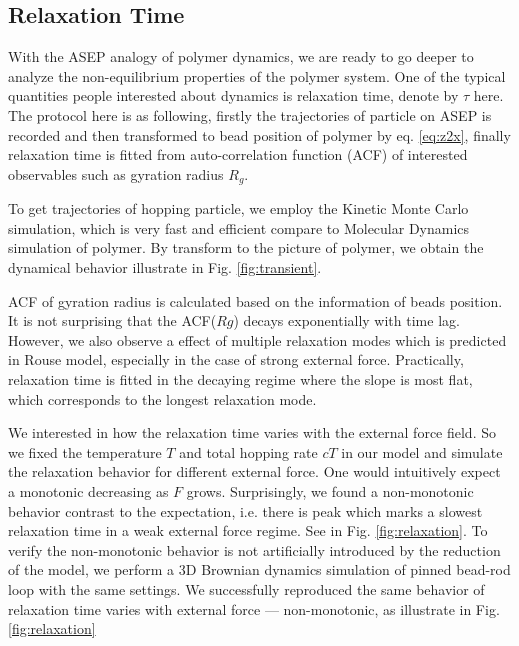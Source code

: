 \documentclass[aps,showpacs,twocolumn,floatfix,prx,superscriptaddress]{revtex4-1}
\begin{document}
\subsection{Relaxation Time}
With the ASEP analogy of polymer dynamics, we are ready to go deeper to analyze
the non-equilibrium properties of the polymer system. One of the typical
quantities people interested about dynamics is relaxation time, denote by
$\tau$ here. The protocol here is as following, firstly the trajectories of
particle on ASEP is recorded and then transformed to bead position of polymer
by eq.  \eqref{eq:z2x}, finally relaxation time is fitted from auto-correlation
function (ACF) of interested observables such as gyration radius $R_g$.

To get trajectories of hopping particle, we employ the Kinetic Monte Carlo
simulation\cite{}, which is very fast and efficient compare to Molecular Dynamics
simulation of polymer. By transform to the picture of polymer, we obtain the
dynamical behavior illustrate in Fig. \ref{fig:transient}. 

ACF of gyration radius is calculated based on the information of beads position.
It is not surprising that the ACF($Rg$) decays exponentially with time
lag. However, we also observe a effect of multiple relaxation modes which is
predicted in Rouse model, especially in the case of strong external force.
Practically, relaxation time is fitted in the decaying regime where the slope
is most flat, which corresponds to the longest relaxation mode.   

We interested in how the relaxation time varies with the external force field.
So we fixed the temperature $T$ and total hopping rate $cT$ in our model and
simulate the relaxation behavior for different external force. One would
intuitively expect a monotonic decreasing as $F$ grows. Surprisingly, we found a
non-monotonic behavior contrast to the expectation, i.e. there is peak which
marks a slowest relaxation time in a weak external force regime. See in Fig.
\ref{fig:relaxation}. To verify the non-monotonic behavior is not artificially
introduced by the reduction of the model, we perform a 3D Brownian dynamics
simulation of pinned bead-rod loop with the same settings. We successfully
reproduced the same behavior of relaxation time varies with external force ---
non-monotonic, as illustrate in Fig. \ref{fig:relaxation}

\end{document}
